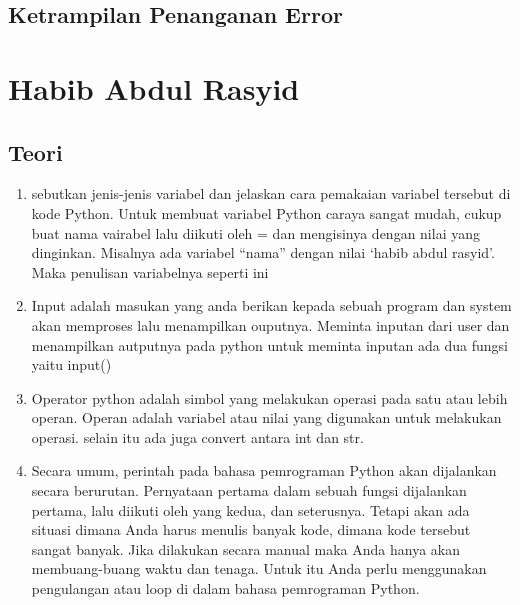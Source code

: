 \subsection{Ketrampilan Penanganan Error}


\section{Habib Abdul Rasyid}
\subsection{Teori}
\begin{enumerate}
    \item sebutkan jenis-jenis variabel dan jelaskan cara pemakaian variabel tersebut di
    kode Python. Untuk membuat variabel Python caraya sangat mudah, cukup buat nama vairabel lalu diikuti oleh = dan mengisinya dengan nilai yang dinginkan.
    Misalnya ada variabel “nama” dengan nilai ‘habib abdul rasyid’. Maka penulisan variabelnya seperti ini 
    

    \item Input adalah masukan yang anda berikan kepada sebuah program dan system akan memproses lalu menampilkan ouputnya.
Meminta inputan dari user dan menampilkan autputnya pada python untuk meminta inputan ada dua fungsi yaitu input()
    

    \item Operator python adalah simbol yang melakukan operasi pada satu atau lebih operan. Operan adalah variabel atau nilai yang digunakan untuk melakukan operasi. selain itu ada juga convert antara int dan str.
    
    

    \item Secara umum, perintah pada bahasa pemrograman Python akan dijalankan secara berurutan. Pernyataan pertama dalam sebuah fungsi dijalankan pertama, lalu diikuti oleh yang kedua, dan seterusnya. Tetapi akan ada situasi dimana Anda harus menulis banyak kode, dimana kode tersebut sangat banyak. Jika dilakukan secara manual maka Anda hanya akan membuang-buang waktu dan tenaga. Untuk itu Anda perlu menggunakan pengulangan atau loop di dalam bahasa pemrograman Python.
    


\end{enumerate}
